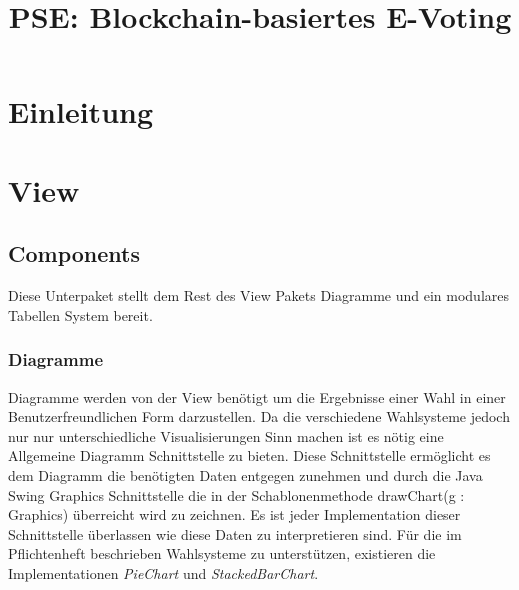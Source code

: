 \documentclass[parskip=full]{scrartcl}
\title{PSE: Blockchain-basiertes E-Voting}
\begin{document}
	\clearpage
	\maketitle
	\newpage
	
	\tableofcontents
	\newpage
	\section{Einleitung}
	
	\section{View}
		\subsection{Components}
		Diese Unterpaket stellt dem Rest des View Pakets Diagramme und ein modulares Tabellen System bereit.
		\subsubsection{Diagramme}
		Diagramme werden von der View benötigt um die Ergebnisse einer Wahl in einer Benutzerfreundlichen Form darzustellen. Da die verschiedene Wahlsysteme jedoch nur nur unterschiedliche Visualisierungen Sinn machen ist es nötig eine Allgemeine Diagramm Schnittstelle zu bieten. Diese Schnittstelle ermöglicht es dem Diagramm die benötigten Daten entgegen zunehmen und durch die Java Swing Graphics Schnittstelle die in der Schablonenmethode drawChart(g : Graphics) überreicht wird zu zeichnen. Es ist jeder Implementation dieser Schnittstelle überlassen wie diese Daten zu interpretieren sind. Für die im Pflichtenheft beschrieben Wahlsysteme zu unterstützen, existieren die Implementationen \textit{PieChart} und \textit{StackedBarChart}.
\end{document}
